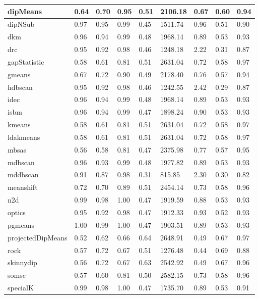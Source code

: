 \begin{table}[H]
\begin{tabular}{|l|l|l|l|l|l|l|l|l|}
\hline
dipMeans & 0.64 & 0.70 & 0.95 & 0.51 & 2106.18 & 0.67 & 0.60 & 0.94 \\
\hline
dipNSub & 0.97 & 0.95 & 0.99 & 0.45 & 1511.74 & 0.96 & 0.51 & 0.90 \\
\hline
dkm & 0.96 & 0.94 & 0.99 & 0.48 & 1968.14 & 0.89 & 0.53 & 0.93 \\
\hline
drc & 0.95 & 0.92 & 0.98 & 0.46 & 1248.18 & 2.22 & 0.31 & 0.87 \\
\hline
gapStatistic & 0.58 & 0.61 & 0.81 & 0.51 & 2631.04 & 0.72 & 0.58 & 0.97 \\
\hline
gmeans & 0.67 & 0.72 & 0.90 & 0.49 & 2178.40 & 0.76 & 0.57 & 0.94 \\
\hline
hdbscan & 0.95 & 0.92 & 0.98 & 0.46 & 1242.55 & 2.42 & 0.29 & 0.87 \\
\hline
idec & 0.96 & 0.94 & 0.99 & 0.48 & 1968.14 & 0.89 & 0.53 & 0.93 \\
\hline
isbm & 0.96 & 0.94 & 0.99 & 0.47 & 1898.24 & 0.90 & 0.53 & 0.93 \\
\hline
kmeans & 0.58 & 0.61 & 0.81 & 0.51 & 2631.04 & 0.72 & 0.58 & 0.97 \\
\hline
ldakmeans & 0.58 & 0.61 & 0.81 & 0.51 & 2631.04 & 0.72 & 0.58 & 0.97 \\
\hline
mbsas & 0.56 & 0.58 & 0.81 & 0.47 & 2375.98 & 0.77 & 0.57 & 0.95 \\
\hline
mdbscan & 0.96 & 0.93 & 0.99 & 0.48 & 1977.82 & 0.89 & 0.53 & 0.93 \\
\hline
mddbscan & 0.91 & 0.87 & 0.98 & 0.31 & 815.85 & 2.30 & 0.30 & 0.82 \\
\hline
meanshift & 0.72 & 0.70 & 0.89 & 0.51 & 2454.14 & 0.73 & 0.58 & 0.96 \\
\hline
n2d & 0.99 & 0.98 & 1.00 & 0.47 & 1919.59 & 0.88 & 0.53 & 0.93 \\
\hline
optics & 0.95 & 0.92 & 0.98 & 0.47 & 1912.33 & 0.93 & 0.52 & 0.93 \\
\hline
pgmeans & 1.00 & 0.99 & 1.00 & 0.47 & 1903.51 & 0.89 & 0.53 & 0.93 \\
\hline
projectedDipMeans & 0.52 & 0.62 & 0.66 & 0.64 & 2648.91 & 0.49 & 0.67 & 0.97 \\
\hline
rock & 0.57 & 0.72 & 0.67 & 0.51 & 1276.48 & 0.44 & 0.69 & 0.88 \\
\hline
skinnydip & 0.56 & 0.72 & 0.67 & 0.63 & 2542.92 & 0.49 & 0.67 & 0.96 \\
\hline
somsc & 0.57 & 0.60 & 0.81 & 0.50 & 2582.15 & 0.73 & 0.58 & 0.96 \\
\hline
specialK & 0.99 & 0.98 & 1.00 & 0.47 & 1735.70 & 0.89 & 0.53 & 0.91 \\

\end{tabular}
\end{table}
